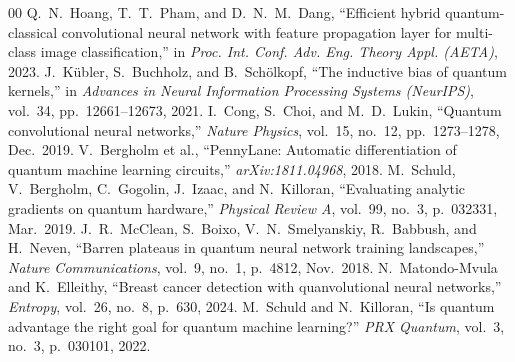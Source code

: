 \documentclass[journal]{IEEEtran}
\begin{document}
\begin{thebibliography}{00}
 Q.~N.~Hoang, T.~T.~Pham, and D.~N.~M.~Dang, ``Efficient hybrid quantum-classical convolutional neural network with feature propagation layer for multi-class image classification,'' in \textit{Proc. Int. Conf. Adv. Eng. Theory Appl. (AETA)}, 2023.
 J.~K{\"u}bler, S.~Buchholz, and B.~Sch{\"o}lkopf, ``The inductive bias of quantum kernels,'' in \textit{Advances in Neural Information Processing Systems (NeurIPS)}, vol.~34, pp.~12661--12673, 2021.
 I.~Cong, S.~Choi, and M.~D.~Lukin, ``Quantum convolutional neural networks,'' \textit{Nature Physics}, vol.~15, no.~12, pp.~1273--1278, Dec.~2019.
 V.~Bergholm et al., ``PennyLane: Automatic differentiation of quantum machine learning circuits,'' \textit{arXiv:1811.04968}, 2018.
 M.~Schuld, V.~Bergholm, C.~Gogolin, J.~Izaac, and N.~Killoran, ``Evaluating analytic gradients on quantum hardware,'' \textit{Physical Review A}, vol.~99, no.~3, p.~032331, Mar.~2019.
 J.~R.~McClean, S.~Boixo, V.~N.~Smelyanskiy, R.~Babbush, and H.~Neven, ``Barren plateaus in quantum neural network training landscapes,'' \textit{Nature Communications}, vol.~9, no.~1, p.~4812, Nov.~2018.
 N.~Matondo-Mvula and K.~Elleithy, ``Breast cancer detection with quanvolutional neural networks,'' \textit{Entropy}, vol.~26, no.~8, p.~630, 2024.
 M.~Schuld and N.~Killoran, ``Is quantum advantage the right goal for quantum machine learning?'' \textit{PRX Quantum}, vol.~3, no.~3, p.~030101, 2022.
\end{thebibliography}
\end{document}
